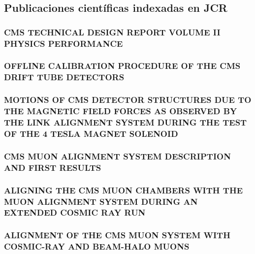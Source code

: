 \documentclass[a4paper, 11pt, twoside, openright]{report}
\begin{document}
\subsection{Publicaciones científicas indexadas en JCR}

\subsubsection{CMS TECHNICAL DESIGN REPORT VOLUME II PHYSICS PERFORMANCE}
%
\subsubsection{OFFLINE CALIBRATION PROCEDURE OF THE CMS DRIFT TUBE DETECTORS}
%
\subsubsection{MOTIONS OF CMS DETECTOR STRUCTURES DUE TO THE MAGNETIC FIELD FORCES AS OBSERVED BY THE LINK ALIGNMENT SYSTEM DURING THE TEST OF THE 4 TESLA MAGNET SOLENOID}
%
\subsubsection{CMS MUON ALIGNMENT SYSTEM DESCRIPTION AND FIRST RESULTS}
%
\subsubsection{ALIGNING THE CMS MUON CHAMBERS WITH THE MUON ALIGNMENT SYSTEM DURING AN EXTENDED COSMIC RAY RUN}
%
\subsubsection{ALIGNMENT OF THE CMS MUON SYSTEM WITH COSMIC-RAY AND BEAM-HALO MUONS}
%
\end{document}
